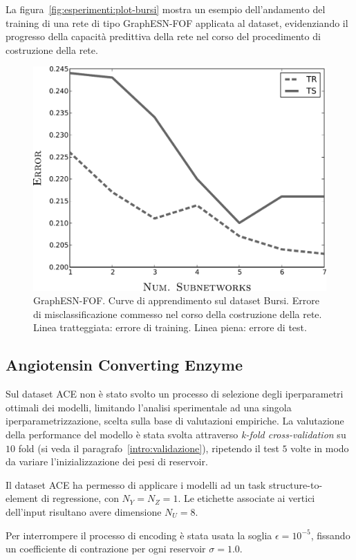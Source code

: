 La figura~\vref{fig:esperimenti:plot-bursi} mostra un esempio dell'andamento del training di una rete di tipo GraphESN-FOF applicata al dataset, evidenziando il progresso della capacità predittiva della rete nel corso del procedimento di costruzione della rete.
\begin{figure}[p]
\centering
\includegraphics[width=0.7\columnwidth]{img/plot/bursi}
\medskip
\caption[Bursi: curve di apprendimento.]{GraphESN-FOF. Curve di apprendimento sul dataset Bursi. Errore di misclassificazione commesso nel corso della costruzione della rete.\\
Linea tratteggiata: errore di training. Linea piena: errore di test.}
\label{fig:esperimenti:plot-bursi}
\end{figure}


\subsection{Angiotensin Converting Enzyme}
Sul dataset ACE non è stato svolto un processo di selezione degli iperparametri ottimali dei modelli, limitando l'analisi sperimentale ad una singola iperparametrizzazione, scelta sulla base di valutazioni empiriche. La valutazione della performance del modello è stata svolta attraverso \emph{k-fold cross-validation} su $10$ fold (si veda il paragrafo~\ref{intro:validazione}), ripetendo il test $5$ volte in modo da variare l'inizializzazione dei pesi di reservoir.

Il dataset ACE ha permesso di applicare i modelli ad un task structure-to-element di regressione, con $N_Y = N_Z = 1$. Le etichette associate ai vertici dell'input risultano avere dimensione $N_U = 8$.

Per interrompere il processo di encoding è stata usata la soglia $\epsilon = 10^{-5}$, fissando un coefficiente di contrazione per ogni reservoir $\sigma = 1.0$.

